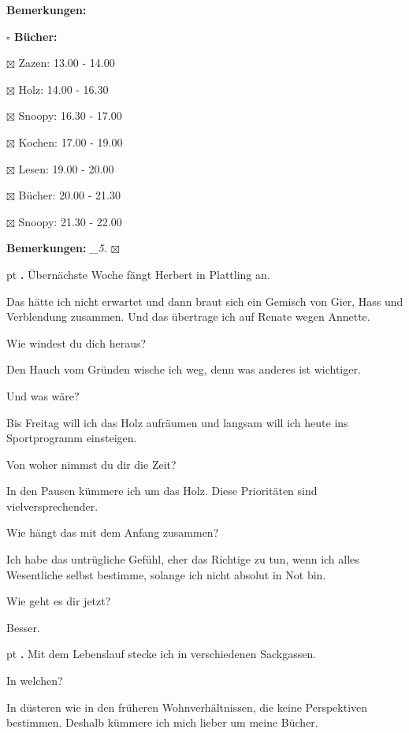 \documentclass[10pt,a4paper]{article}
\newcounter{notec}
\newcommand\notep[1]{%
  \stepcounter{notec}
  \vskip #1pt
  {\bf\arabic{notec}.}
}
\newcommand\prop[1] {{\color {alizarin} {\bf #1}}}             %
\newcommand\mand[1] {{\color {burntorange} {\bf #1}}}          %
\newcommand\bottomspace{\vskip 4pt}
\newcommand\n[1] { {\sl #1.} \hskip 5pt }
\begin{document}
\begin{mdframed}[style=daystyle]
\begin{labeling}{{\mand {Bemerkungen:}}}
\begin{minipage}{0.75\textwidth}
\begin{labeling}{\prop {$\square$ { Bücher:}}}
      \item[$\boxtimes$ Zazen:]   13.00 - 14.00
      \item[$\boxtimes$ Holz:]    14.00 - 16.30
      \item[$\boxtimes$ Snoopy:]  16.30 - 17.00        
      \item[$\boxtimes$ Kochen:]  17.00 - 19.00        
      \item[$\boxtimes$ Lesen:]   19.00 - 20.00
      \item[$\boxtimes$ Bücher:]  20.00 - 21.30
      \item[$\boxtimes$ Snoopy:]  21.30 - 22.00
      \end{labeling}
    \end{minipage}
    \bottomspace
  \item[{\mand {Bemerkungen:}}]   \n{\_5} $\boxtimes$
  \end{labeling}
    
  \setcounter{notec}{0}
  
  \notep 0 Übernächste Woche fängt Herbert in Plattling an.

  \vskip 2pt
  Das hätte ich nicht erwartet und dann braut sich ein Gemisch von Gier, Hass und
  Verblendung zusammen. Und das übertrage ich auf Renate wegen Annette.

  \vskip 2pt
  Wie windest du dich heraus?

  \vskip 2pt
  Den Hauch vom Gründen wische ich weg, denn was anderes ist wichtiger.

  \vskip 2pt
  Und was wäre?

  \vskip 2pt
  Bis Freitag will ich das Holz aufräumen und langsam will ich heute ins
  Sportprogramm einsteigen.

  \vskip 2pt
  Von woher nimmst du dir die Zeit?

  \vskip 2pt
  In den Pausen kümmere ich um das Holz. Diese Prioritäten sind
  vielversprechender.

  \vskip 2pt
  Wie hängt das mit dem Anfang zusammen?

  \vskip 2pt
  Ich habe das untrügliche Gefühl, eher das Richtige zu tun, wenn ich alles
  Wesentliche selbst bestimme, solange ich nicht absolut in Not bin.

  \vskip 2pt
  Wie geht es dir jetzt?

  \vskip 2pt
  Besser.

  \notep 4 Mit dem Lebenslauf stecke ich in verschiedenen Sackgassen.

  \vskip 2pt
  In welchen?

  \vskip 2pt
  In düsteren wie in den früheren Wohnverhältnissen, die keine Perspektiven
  bestimmen. Deshalb kümmere ich mich lieber um meine Bücher.

\end{mdframed}
\end{document}
